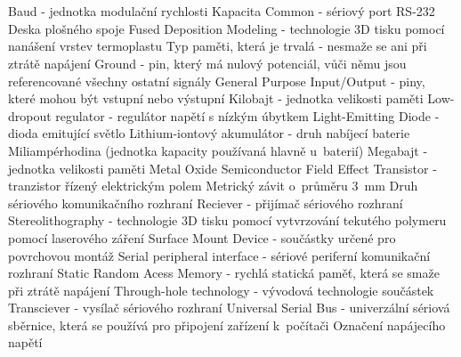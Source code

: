 \cleardoublepage
\chapter*{\listofabbrevname}
{}

\begin{acronym}[KolikMista]
		{Baud - jednotka modulační rychlosti}
		{Kapacita}
		{Common - sériový port RS-232}
		{Deska plošného spoje}
		{Fused Deposition Modeling - technologie 3D tisku pomocí nanášení vrstev termoplastu}
		{Typ paměti, která je trvalá - nesmaže se ani při ztrátě napájení}
		{Ground - pin, který má nulový potenciál, vůči němu jsou referencované všechny ostatní signály}
		{General Purpose Input/Output - piny, které mohou být vstupní nebo výstupní}
		{Kilobajt - jednotka velikosti paměti}
		{Low-dropout regulator - regulátor napětí s nízkým úbytkem}
		{Light-Emitting Diode - dioda emitující světlo}
		{Lithium-iontový akumulátor - druh nabíjecí baterie}
		{Miliampérhodina (jednotka kapacity používaná hlavně u~baterií)}
		{Megabajt - jednotka velikosti paměti}
		{Metal Oxide Semiconductor Field Effect Transistor - tranzistor řízený elektrickým polem}	
		{Metrický závit o~průměru 3~mm}
		{Druh sériového komunikačního rozhraní} 
		{Reciever - přijímač sériového rozhraní}
		{Stereolithography - technologie 3D tisku pomocí vytvrzování tekutého polymeru pomocí laserového záření}
		{Surface Mount Device - součástky určené pro povrchovou montáž} 
		{Serial peripheral interface - sériové periferní komunikační rozhraní}
		{Static Random Acess Memory - rychlá statická paměť, která se smaže při ztrátě napájení}	
		{Through-hole technology - vývodová technologie součástek}
		{Transciever - vysílač sériového rozhraní} 
		{Universal Serial Bus - univerzální sériová sběrnice, která se používá pro připojení zařízení k~počítači}
		{Označení napájecího napětí}

\end{acronym}
